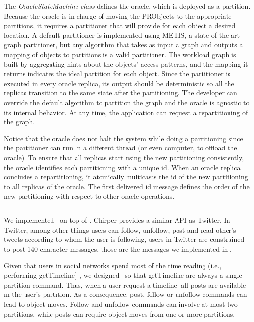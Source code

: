 The \emph{OracleStateMachine class} defines the oracle, which is deployed as a partition. 
Because the oracle is in charge of moving the PRObjects to the appropriate 
partitions, it requires a partitioner that will provide for each object a desired location. A default partitioner is implemented using METIS, a state-of-the-art graph partitioner, but any algorithm that takes as input a graph and outputs a mapping of objects to partitions is a valid
partitioner.
The workload graph is built by aggregating hints about the objects' access patterns, and the mapping it returns indicates the ideal partition for each object. Since the partitioner is executed in every oracle replica,
its output should be deterministic so all the replicas transition to the same state after the partitioning. 
The developer can override the default algorithm to partition the graph and the oracle is agnostic to its internal behavior.
At any time, the application can request a repartitioning of the graph.

Notice that the oracle does not halt the system while doing a partitioning since the partitioner can
run in a different thread (or even computer, to offload the oracle). 
To ensure that all replicas start using the new partitioning consistently, the oracle identifies each partitioning with a unique id.
When an oracle replica concludes a repartitioning, it atomically multicasts the id of the new partitioning to all replicas of the oracle.
The first delivered id message defines the order of the new partitioning with respect to other oracle operations.


\subsection{\appname}
\label{sec:imp:\appname}
We implemented \appname\ on top of \libname.
Chirper provides a similar API as Twitter. In Twitter, among other things
users can follow, unfollow, post and read other's tweets according to whom the user is following, users in Twitter are
constrained to post 140-character messages, those are the messages we implemented in \appname.

Given that users in social networks spend most of the time reading (i.e., performing getTimeline)
\cite{facebookTAO}, we designed \appname\ so that getTimeline are always a single-partition command.
Thus, when a user request a timeline, all posts are available in the user's partition.
As a consequence, post, follow or unfollow commands can lead to object moves.
Follow and unfollow commands can involve at most two partitions, while posts can require object moves from
one or more partitions.

